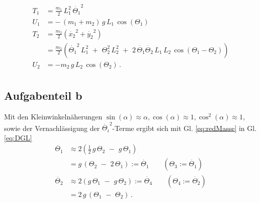 \begin{equation}
	 \begin{split}
 		T_1 &= \frac{m_1}{2}\, L_1^2\, \dot{\Theta_1}^2 \\
 		U_1 &= -\,(m_1+m_2)\,g\,L_1\,\cos(\Theta_1) \\
 		T_2 &= \frac{m_2}{2} \left( \dot{x_2}^2 + \dot{y_2}^2 \right) \\
 			&= \frac{m_2}{2} \left( \dot{\Theta_1}^2\,L_1^2\,\,+\,\,\Theta_2^2\,L_2^2\,\,+\,\,2\,\dot{\Theta_1}\dot{\Theta_2}\,L_1\,L_2\,\cos(\Theta_1-\Theta_2)\right)\\
 		U_2 &= -m_2\,g\,L_2\,\cos(\Theta_2) \,. \\
	 \end{split}
	 \label{eq:Energiebetraege}
\end{equation}

\subsection*{Aufgabenteil b}
Mit den Kleinwinkelnäherungen $\sin(\alpha) \approx \alpha, \cos(\alpha) \approx 1, \cos^2(\alpha) \approx 1$, sowie der Vernachlässigung der $\dot{\Theta_i}^2$-Terme ergibt sich mit Gl. \eqref{eq:redMasse} in Gl. \eqref{eq:DGL}
\begin{equation}
	\begin{split}
		\ddot{\Theta_1} &\approx 2 \left(\frac{1}{2}\,g\,\Theta_2\,\,-\,\,g\,\Theta_1\right) \\
						&= g\,(\Theta_2\,\,-\,\,2\,\Theta_1) := \dot{\Theta_1}\qquad(\Theta_3 := \dot{\Theta_1}) \\
		\ddot{\Theta_2} &\approx 2 \left(g\,\Theta_1\,\,-\,\,g\,\Theta_2\right) := \dot{\Theta_4} \qquad(\Theta_4 := \dot{\Theta_2}) \\
						&= 2\,g\,(\Theta_1\,\,-\,\,\Theta_2) \,. \\
	\end{split}
	\label{eq:DGLTheta}
\end{equation}

